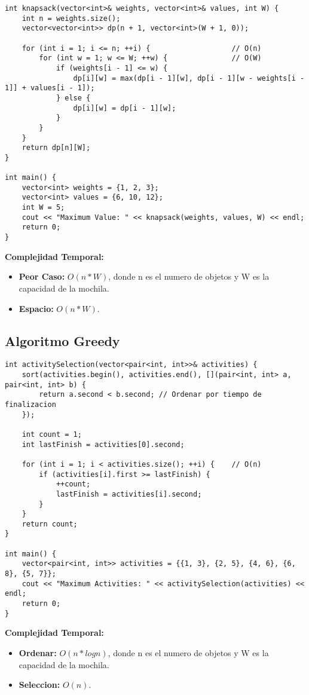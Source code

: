     \begin{lstlisting}[style=cpp]
int knapsack(vector<int>& weights, vector<int>& values, int W) {
    int n = weights.size();
    vector<vector<int>> dp(n + 1, vector<int>(W + 1, 0));

    for (int i = 1; i <= n; ++i) {                   // O(n)
        for (int w = 1; w <= W; ++w) {               // O(W)
            if (weights[i - 1] <= w) {
                dp[i][w] = max(dp[i - 1][w], dp[i - 1][w - weights[i - 1]] + values[i - 1]);
            } else {
                dp[i][w] = dp[i - 1][w];
            }
        }
    }
    return dp[n][W];
}

int main() {
    vector<int> weights = {1, 2, 3};
    vector<int> values = {6, 10, 12};
    int W = 5;
    cout << "Maximum Value: " << knapsack(weights, values, W) << endl;
    return 0;
}

    \end{lstlisting}
    \textbf{Complejidad Temporal: }
    \begin{itemize}
        \item \textbf{Peor Caso: }$O(n *W)$, donde n es el numero de objetos y W es la capacidad de la mochila.
        \item \textbf{Espacio: }$O(n*W).$
    \end{itemize}

\subsection{Algoritmo Greedy}
    \begin{lstlisting}[style=cpp]
int activitySelection(vector<pair<int, int>>& activities) {
    sort(activities.begin(), activities.end(), [](pair<int, int> a, pair<int, int> b) {
        return a.second < b.second; // Ordenar por tiempo de finalizacion
    });

    int count = 1;
    int lastFinish = activities[0].second;

    for (int i = 1; i < activities.size(); ++i) {    // O(n)
        if (activities[i].first >= lastFinish) {
            ++count;
            lastFinish = activities[i].second;
        }
    }
    return count;
}

int main() {
    vector<pair<int, int>> activities = {{1, 3}, {2, 5}, {4, 6}, {6, 8}, {5, 7}};
    cout << "Maximum Activities: " << activitySelection(activities) << endl;
    return 0;
}
    \end{lstlisting}
    \textbf{Complejidad Temporal: }
    \begin{itemize}
        \item \textbf{Ordenar: }$O(n*logn)$, donde n es el numero de objetos y W es la capacidad de la mochila.
        \item \textbf{Seleccion: }$O(n).$
    \end{itemize}

